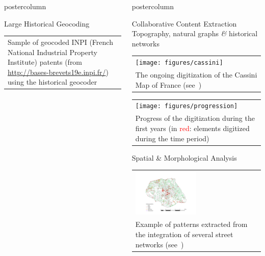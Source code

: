 \documentclass[final,hyperref={pdfpagelabels=false}]{beamer}
\let\oldcite=\cite
\renewcommand{\cite}[1]{\textcolor{ta3chameleon}{\oldcite{#1}}}
\begin{document}
\begin{frame}
\begin{columns}
\begin{column}{0.5\textwidth}
\begin{beamercolorbox}[center,wd=\textwidth]{postercolumn}
\begin{minipage}[t]{.98\textwidth}
\begin{block}{Large Historical Geocoding}
\begin{tabular}{>{\centering}m{}}
        \scriptsize Sample of geocoded INPI (French National Industrial Property Institute) patents (from \url{http://bases-brevets19e.inpi.fr/}) using the historical geocoder~\cite{Cura2018}
      \end{tabular}
    \end{block}
    \end{minipage}
    \end{beamercolorbox}
    \end{column}
    \begin{column}{0.5\textwidth}
    \begin{beamercolorbox}[center,wd=\textwidth]{postercolumn}
    \begin{minipage}[t]{.98\textwidth}
      \begin{block}{Collaborative Content Extraction}
        \centering
        Topography, natural graphs \textit{\&} historical networks
        \begin{tabular}{>{\centering}p{}}
	  \texttt{[image: figures/cassini]} \\
          \scriptsize The ongoing digitization of the Cassini Map of France (see~\cite{Perret2015_,Perret2015Data_})\
        \end{tabular}
        \begin{tabular}{>{\centering}p{}}
          \texttt{[image: figures/progression]}\\
          \scriptsize Progress of the digitization during the first years (in \textcolor{red}{red}: elements digitized during the time period)
        \end{tabular}
      \end{block}
      \begin{block}{Spatial \& Morphological Analysis}
        \centering
	\begin{tabular}{>{\centering}m{}}
	  \includegraphics[width=0.5\textwidth,trim={3.5cm 1.25cm 3.5cm 2.5cm},clip]{figures/EvolutionPatterns}\\
	  \scriptsize Example of patterns extracted from the integration of several street networks (see~\cite{Costes2015_,Costes2016PhD})\\
        \end{tabular}
        

\end{block}
\end{minipage}
\end{beamercolorbox}
\end{column}
\end{columns}
\end{frame}
\end{document}
